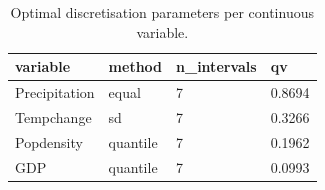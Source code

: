 \begin{table}[t]\centering
\caption{Optimal discretisation parameters per continuous variable.}\label{tab:disc}
\begin{tabular}{llll}
\hline
variable & method & n_intervals & qv \\
\hline
Precipitation & equal & 7 & 0.8694 \\
Tempchange & sd & 7 & 0.3266 \\
Popdensity & quantile & 7 & 0.1962 \\
GDP & quantile & 7 & 0.0993 \\
\hline
\end{tabular}\end{table}
